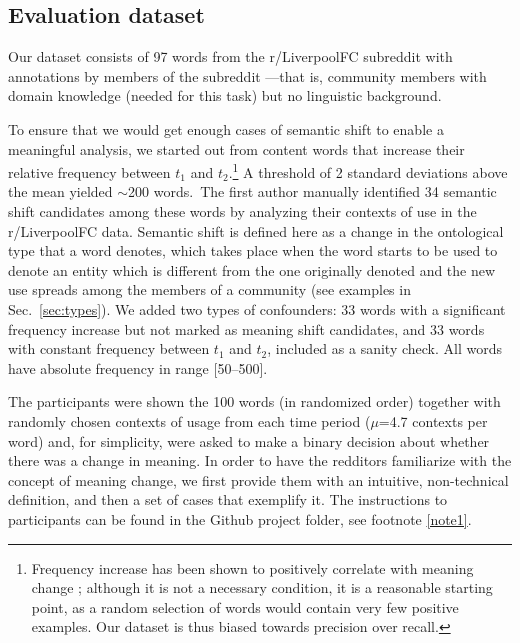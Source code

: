 

\subsection{Evaluation dataset}
\label{subsec:Evaluation dataset}

Our dataset consists of 97 words from the r/LiverpoolFC subreddit with
annotations by members of the subreddit ---that is, community members
with domain knowledge (needed for this task) but no linguistic
background.

To ensure that we would get enough cases of semantic shift to enable a
meaningful analysis, we started out from content words that increase
their relative frequency between $t_1$ and $t_2$.\footnote{Frequency
  increase has been shown to positively correlate with meaning change
  \cite{wijaya2011understanding,kulkarni2015statistically}; although
  it is not a necessary condition, it is a reasonable starting point,
  as a random selection of words would contain very few positive
  examples. Our dataset is thus biased towards precision over recall.}
A threshold of 2 standard deviations above the mean yielded
$\sim$200 words.~The first author manually identified 34 semantic
shift candidates among these words by analyzing their contexts of use
in the r/LiverpoolFC data.  Semantic shift is defined here as a change
in the ontological type that a word denotes, which takes place when the word starts to be used to denote an entity which is different from the one originally denoted and the new use spreads among the members of a community (see examples in Sec.~\ref{sec:types}).
We added two types of confounders: 33 words
with a significant frequency increase but not marked as meaning
shift candidates, and 33 words with constant frequency between $t_1$
and $t_2$, included as a sanity check. All words have
  absolute frequency in range [50--500].

The participants were shown the 100 words (in randomized order)
together with randomly chosen contexts of usage from each time period
($\mu$=4.7 contexts per word) and, for simplicity, were asked to make
a binary decision about whether there was a change in meaning. In order to have the redditors familiarize with the concept of meaning change, we first provide them with an intuitive, non-technical definition, and then a set of cases that exemplify it. The instructions to participants can be found in the Github project folder, see footnote \ref{note1}.


